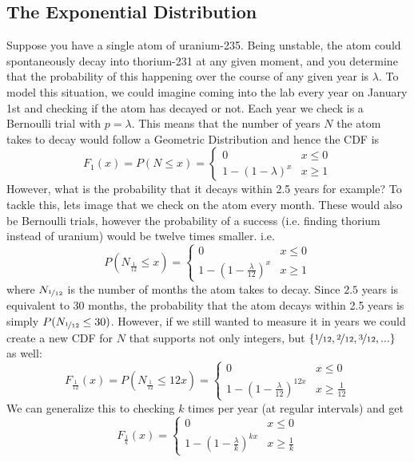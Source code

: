 \documentclass{report}
\begin{document}
\subsection{The Exponential Distribution}
\newcommand{\expon}{\textup{Exp}}
Suppose you have a single atom of uranium-235. Being unstable, the atom could spontaneously decay into thorium-231 at any given moment, and you determine that the probability of this happening over the course of any given year is $\lambda$. To model this situation, we could imagine coming into the lab every year on January 1st and checking if the atom has decayed or not. Each year we check is a Bernoulli trial with $p=\lambda$. This means that the number of years $N$ the atom takes to decay would follow a Geometric Distribution and hence the CDF is
\[
    F_1(x)
    = P(N\le x)
    = \begin{cases}
        0 & x \le 0
        \\
        1-(1-\lambda)^x & x\ge 1
    \end{cases}
\]
However, what is the probability that it decays within 2.5 years for example? To tackle this, lets image that we check on the atom every month. These would also be Bernoulli trials, however the probability of a success (i.e. finding thorium instead of uranium) would be twelve times smaller. i.e. 
\[
    P(N_{\frac 1{12}}\le x)
    = \begin{cases}
        0 & x \le 0
        \\
        1-\left(1-\frac \lambda {12}\right)^x & x\ge 1
    \end{cases}
\]
where $N_{\nicefrac 1{12}}$ is the number of months the atom takes to decay. Since $2.5$ years is equivalent to 30 months, the probability that the atom decays within 2.5 years is simply $P(N_{\nicefrac 1{12}} \le 30)$. However, if we still wanted to measure it in years we could create a new CDF for $N$ that supports not only integers, but $\{\nicefrac 1{12} , \nicefrac 2{12}, \nicefrac 3{12},...\}$ as well:
\[
    F_{\frac 1{12}}(x) 
    = P\left(N_{\frac 1{12}}\le 12x\right)
    = \begin{cases}
        0 & x \le 0
        \\
        1-\left(1-\frac \lambda {12}\right)^{12x} & x\ge \frac 1{12}
    \end{cases}
\]
We can generalize this to checking $k$ times per year (at regular intervals) and get
\[
    F_{\frac 1k}(x) 
    = \begin{cases}
        0 & x \le 0
        \\
        1-\left(1-\frac \lambda k\right)^{kx} & x\ge \frac 1k
    \end{cases}
\]
\end{document}
